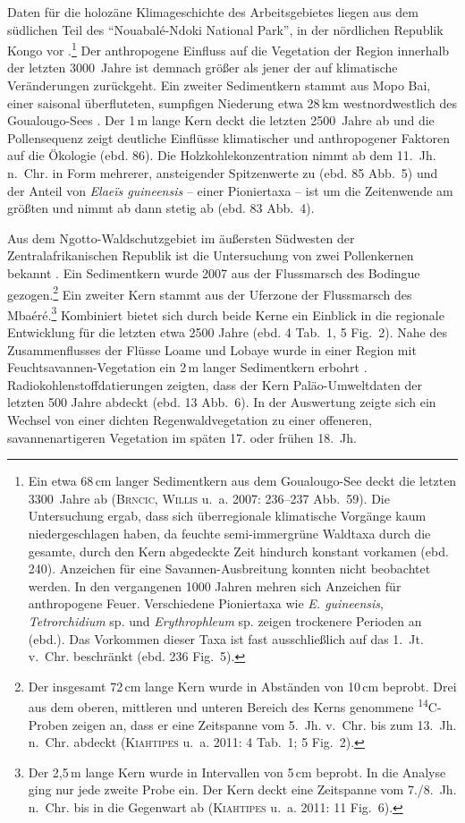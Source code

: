 \begin{multicols}{2}
Daten für die holozäne Klimageschichte des Arbeitsgebietes liegen aus dem südlichen Teil des \enquote{Nouabalé-Ndoki National Park}, in der nördlichen Republik Kongo vor \parencite{Brncic.2007}.\footnote{Ein etwa 68\,cm langer Sedimentkern aus dem Goualougo-See deckt die letzten 3300~Jahre ab (\textsc{Brncic, Willis} u.~a. 2007: 236--237 Abb.~59). Die Untersuchung ergab, dass sich überregionale klimatische Vorgänge kaum niedergeschlagen haben, da feuchte semi-immergrüne Waldtaxa durch die gesamte, durch den Kern abgedeckte Zeit hindurch konstant vorkamen (ebd. 240). Anzeichen für eine Savannen-Ausbreitung konnten nicht beobachtet werden. In den vergangenen 1000 Jahren mehren sich Anzeichen für anthropogene Feuer. Verschiedene Pioniertaxa wie \textit{E. guineensis}, \textit{Tetrorchidium} sp. und \textit{Erythrophleum} sp. zeigen trockenere Perioden an (ebd.). Das Vorkommen dieser Taxa ist fast ausschließlich auf das 1.~Jt. v.~Chr. beschränkt (ebd. 236 Fig.~5).} Der anthropogene Einfluss auf die Vegetation der Region innerhalb der letzten 3000~Jahre ist demnach größer als jener der auf klimatische Veränderungen zurückgeht. Ein zweiter Sedimentkern stammt aus Mopo Bai, einer saisonal überfluteten, sumpfigen Niederung etwa 28\,km westnordwestlich des Goualougo-Sees \parencite[80]{Brncic.2009}. Der 1\,m lange Kern deckt die letzten 2500~Jahre ab und die Pollensequenz zeigt deutliche Einflüsse klimatischer und anthropogener Faktoren auf die Ökologie (ebd. 86). Die Holzkohlekonzentration nimmt ab dem 11.~Jh. n.~Chr. in Form mehrerer, ansteigender Spitzenwerte zu (ebd. 85 Abb.~5) und der Anteil von \textit{Elaeïs guineensis} -- einer Pioniertaxa -- ist um die Zeitenwende am größten und nimmt ab dann stetig ab (ebd. 83 Abb.~4).

Aus dem Ngotto-Waldschutzgebiet im äußersten Südwesten der Zentralafrikanischen Republik ist die Untersuchung von zwei Pollenkernen bekannt \parencite{Kiahtipes.2011}. Ein Sedimentkern wurde 2007 aus der Flussmarsch des Bodingue gezogen.\footnote{Der insgesamt 72\,cm lange Kern wurde in Abständen von 10\,cm beprobt. Drei aus dem oberen, mittleren und unteren Bereich des Kerns genommene \textsuperscript{14}C-Proben zeigen an, dass er eine Zeitspanne vom 5.~Jh. v.~Chr. bis zum 13.~Jh. n.~Chr. abdeckt (\textsc{Kiahtipes} u.~a. 2011: 4 Tab.~1; 5 Fig.~2).} Ein zweiter Kern stammt aus der Uferzone der Flussmarsch des Mbaéré.\footnote{Der 2,5\,m lange Kern wurde in Intervallen von 5\,cm beprobt. In die Analyse ging nur jede zweite Probe ein. Der Kern deckt eine Zeitspanne vom 7./8.~Jh. n.~Chr. bis in die Gegenwart ab (\textsc{Kiahtipes} u.~a. 2011: 11 Fig.~6).} Kombiniert bietet sich durch beide Kerne ein Einblick in die regionale Entwicklung für die letzten etwa 2500 Jahre (ebd. 4 Tab.~1, 5 Fig.~2). Nahe des Zusammenflusses der Flüsse Loame und Lobaye wurde in einer Region mit Feuchtsavannen-Vegetation ein 2\,m langer Sedimentkern erbohrt \parencite[5]{Lupo.2015}. Radiokohlenstoffdatierungen zeigten, dass der Kern Paläo-Umweltdaten der letzten 500 Jahre abdeckt (ebd. 13 Abb.~6). In der Auswertung zeigte sich ein Wechsel von einer dichten Regenwaldvegetation zu einer offeneren, savannenartigeren Vegetation im späten 17. oder frühen 18.~Jh.
\end{multicols}